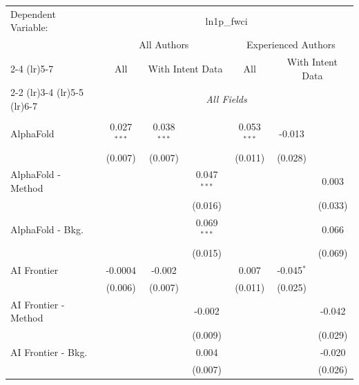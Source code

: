 \begingroup
\centering
\begin{tabular}{lcccccc}
   \tabularnewline \midrule \midrule
   Dependent Variable: & \multicolumn{6}{c}{ln1p\_fwci}\\
 & \multicolumn{3}{c}{All Authors} & \multicolumn{3}{c}{Experienced Authors} \\
\cmidrule(lr){2-4} \cmidrule(lr){5-7}
 & \multicolumn{1}{c}{All} & \multicolumn{2}{c}{With Intent Data} & \multicolumn{1}{c}{All} & \multicolumn{2}{c}{With Intent Data} \\
\cmidrule(lr){2-2} \cmidrule(lr){3-4} \cmidrule(lr){5-5} \cmidrule(lr){6-7}
 & \multicolumn{6}{c}{\textit{All Fields}} \\ \\
   AlphaFold            & 0.027$^{***}$ & 0.038$^{***}$ &               & 0.053$^{***}$ & -0.013       &   \\   
                        & (0.007)       & (0.007)       &               & (0.011)       & (0.028)      &   \\   
   AlphaFold - Method   &               &               & 0.047$^{***}$ &               &              & 0.003\\   
                        &               &               & (0.016)       &               &              & (0.033)\\   
   AlphaFold - Bkg.     &               &               & 0.069$^{***}$ &               &              & 0.066\\   
                        &               &               & (0.015)       &               &              & (0.069)\\   
   AI Frontier          & -0.0004       & -0.002        &               & 0.007         & -0.045$^{*}$ &   \\   
                        & (0.006)       & (0.007)       &               & (0.011)       & (0.025)      &   \\   
   AI Frontier - Method &               &               & -0.002        &               &              & -0.042\\   
                        &               &               & (0.009)       &               &              & (0.029)\\   
   AI Frontier - Bkg.   &               &               & 0.004         &               &              & -0.020\\   
                        &               &               & (0.007)       &               &              & (0.026)\\   

\end{tabular}

